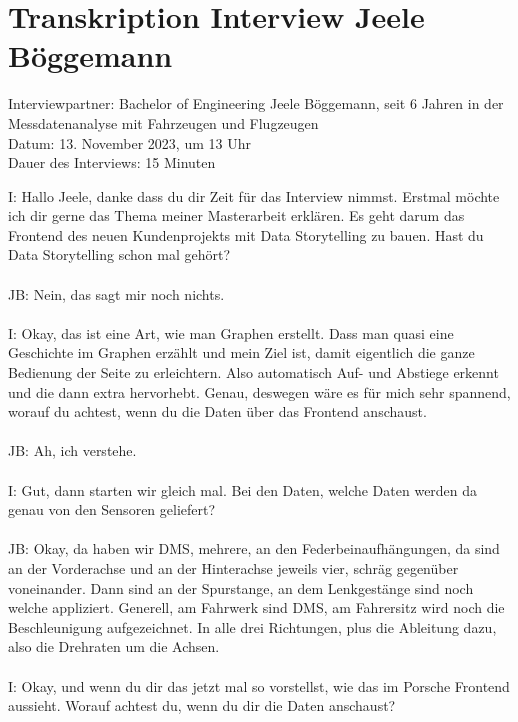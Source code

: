 \section{Transkription Interview Jeele Böggemann}
\label{appendix:interview_trends_boeggemann}
Interviewpartner: Bachelor of Engineering Jeele Böggemann, seit 6 Jahren in der Messdatenanalyse mit Fahrzeugen und Flugzeugen\\
Datum: 13. November 2023, um 13 Uhr\\
Dauer des Interviews: 15 Minuten\\

\begin{linenumbers}
\noindent
I: Hallo Jeele, danke dass du dir Zeit für das Interview nimmst. Erstmal möchte ich dir gerne das Thema meiner Masterarbeit erklären. Es geht darum das Frontend des neuen Kundenprojekts mit Data Storytelling zu bauen. Hast du Data Storytelling schon mal gehört?\\\\
JB: Nein, das sagt mir noch nichts.\\\\
I: Okay, das ist eine Art, wie man Graphen erstellt. Dass man quasi eine Geschichte im Graphen erzählt und mein Ziel ist, damit eigentlich die ganze Bedienung der Seite zu erleichtern. Also automatisch Auf- und Abstiege erkennt und die dann extra hervorhebt. Genau, deswegen wäre es für mich sehr spannend, worauf du achtest, wenn du die Daten über das Frontend anschaust.\\\\
JB: Ah, ich verstehe.\\\\
I: Gut, dann starten wir gleich mal. Bei den Daten, welche Daten werden da genau von den Sensoren geliefert?\\\\
JB: Okay, da haben wir \ac{DMS}, mehrere, an den Federbeinaufhängungen, da sind an der Vorderachse und an der Hinterachse jeweils vier, schräg gegenüber voneinander. Dann sind an der Spurstange, an dem Lenkgestänge sind noch welche appliziert. Generell, am Fahrwerk sind \ac{DMS}, am Fahrersitz wird noch die Beschleunigung aufgezeichnet. In alle drei Richtungen, plus die Ableitung dazu, also die Drehraten um die Achsen.\\\\
I: Okay, und wenn du dir das jetzt mal so vorstellst, wie das im Porsche Frontend aussieht. Worauf achtest du, wenn du dir die Daten anschaust?\\\\

\end{linenumbers}
